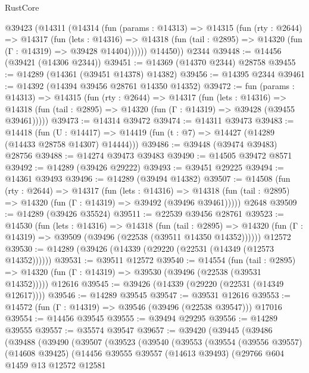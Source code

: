 \begin{lexlean}{RustCore}
\begin{coremodule}
    @39423
      (@14311
        (@14314
          (fun (params : @14313) =>
          @14315
            (fun (rty : @2644) =>
            @14317
              (fun (lets : @14316) =>
              @14318 (fun (tail : @2895) => @14320 (fun (Γ : @14319) => @39428 @14404))))))
        @14450))
    @2344
@39448 := @14456 (@39421 (@14306 @2344))
@39451 := @14369 (@14370 @2344) @28758
@39455 := @14289 (@14361 (@39451 @14378) @14382)
@39456 := @14395 @2344
@39461 := @14392 (@14394 @39456 @28761 @14350 @14352)
@39472 := fun (params : @14313) =>
  @14315
    (fun (rty : @2644) =>
    @14317
      (fun (lets : @14316) =>
      @14318 (fun (tail : @2895) => @14320 (fun (Γ : @14319) => @39428 (@39455 @39461)))))
@39473 := @14314 @39472
@39474 := @14311 @39473
@39483 := @14418
    (fun (U : @14417) => @14419 (fun (t : @7) => @14427 (@14289 (@14433 @28758 @14307) @14444)))
@39486 := @39448 (@39474 @39483) @28756
@39488 := @14274 @39473 @39483
@39490 := @14505 @39472 @8571
@39492 := @14289 (@39426 @29222)
@39493 := @39451 @29225
@39494 := @14361 @39493
@39496 := @14289 (@39494 @14382)
@39507 := @14508
    (fun (rty : @2644) =>
    @14317
      (fun (lets : @14316) =>
      @14318 (fun (tail : @2895) => @14320 (fun (Γ : @14319) => @39492 (@39496 @39461)))))
    @2648
@39509 := @14289 (@39426 @35524)
@39511 := @22539 @39456 @28761
@39523 := @14530
    (fun (lets : @14316) =>
    @14318
      (fun (tail : @2895) =>
      @14320 (fun (Γ : @14319) => @39509 (@39496 (@22538 (@39511 @14350 @14352))))))
    @12572
@39530 := @14289 (@39426 (@14339 (@29220 (@22531 (@14349 (@12573 @14352))))))
@39531 := @39511 @12572
@39540 := @14554
    (fun (tail : @2895) => @14320 (fun (Γ : @14319) => @39530 (@39496 (@22538 (@39531 @14352)))))
    @12616
@39545 := @39426 (@14339 (@29220 (@22531 (@14349 @12617))))
@39546 := @14289 @39545
@39547 := @39531 @12616
@39553 := @14572 (fun (Γ : @14319) => @39546 (@39496 (@22538 @39547))) @17016
@39554 := @14456 @39545
@39555 := @39494 @29295
@39556 := @14289 @39555
@39557 := @35574 @39547
@39657 := @39420
    (@39445
      (@39486
        (@39488
          (@39490
            (@39507
              (@39523
                (@39540
                  (@39553
                    (@39554
                      (@39556 @39557)
                      (@14608 @39425)
                      (@14456
                        @39555
                        @39557
                        (@14613 @39493)
                        (@29766
                          @604
                          @1459
                          @13
                          @12572
                          @12581

\end{coremodule}
\end{lexlean}
